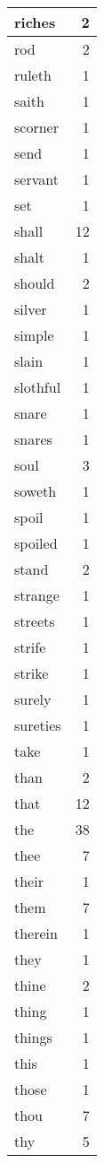 \begin{center}
\begin{longtable}{l|r}
riches & 2\\ \hline 
rod & 2\\ \hline 
ruleth & 1\\ \hline 
saith & 1\\ \hline 
scorner & 1\\ \hline 
send & 1\\ \hline 
servant & 1\\ \hline 
set & 1\\ \hline 
shall & 12\\ \hline 
shalt & 1\\ \hline 
should & 2\\ \hline 
silver & 1\\ \hline 
simple & 1\\ \hline 
slain & 1\\ \hline 
slothful & 1\\ \hline 
snare & 1\\ \hline 
snares & 1\\ \hline 
soul & 3\\ \hline 
soweth & 1\\ \hline 
spoil & 1\\ \hline 
spoiled & 1\\ \hline 
stand & 2\\ \hline 
strange & 1\\ \hline 
streets & 1\\ \hline 
strife & 1\\ \hline 
strike & 1\\ \hline 
surely & 1\\ \hline 
sureties & 1\\ \hline 
take & 1\\ \hline 
than & 2\\ \hline 
that & 12\\ \hline 
the & 38\\ \hline 
thee & 7\\ \hline 
their & 1\\ \hline 
them & 7\\ \hline 
therein & 1\\ \hline 
they & 1\\ \hline 
thine & 2\\ \hline 
thing & 1\\ \hline 
things & 1\\ \hline 
this & 1\\ \hline 
those & 1\\ \hline 
thou & 7\\ \hline 
thy & 5\\ \hline 

\end{longtable}
\end{center}
